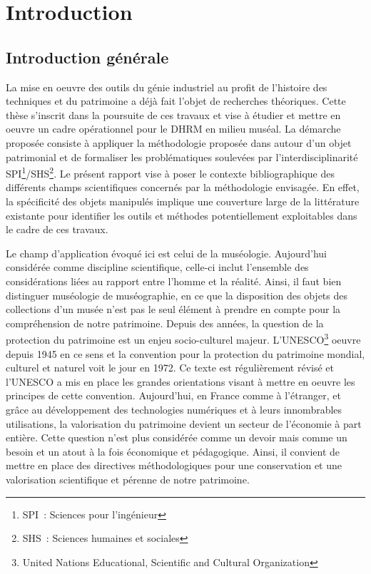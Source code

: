 \documentclass[a4paper,11pt,french]{article}
\begin{document}
\newpage
\tableofcontents
\newpage
\section{Introduction}

\subsection{Introduction générale}
La mise en oeuvre des outils du génie industriel au profit de l'histoire des techniques et du patrimoine a déjà fait l'objet de recherches théoriques\cite{Laroche2007}. Cette thèse s'inscrit dans la poursuite de ces travaux et vise à étudier et mettre en oeuvre un cadre opérationnel pour le DHRM en milieu muséal.
La démarche proposée consiste à appliquer la méthodologie proposée dans \cite{Laroche2007} autour d'un objet patrimonial et de formaliser les problématiques soulevées par l'interdisciplinarité SPI\footnote{SPI~: Sciences pour l'ingénieur}/SHS\footnote{SHS~: Sciences humaines et sociales}.
Le présent rapport vise à poser le contexte bibliographique des différents champs scientifiques concernés par la méthodologie envisagée. En effet, la spécificité des objets manipulés implique une couverture large de la littérature existante pour identifier les outils et méthodes potentiellement exploitables dans le cadre de ces travaux.

Le champ d'application évoqué ici est celui de la muséologie. Aujourd'hui considérée comme discipline scientifique, celle-ci inclut l'ensemble des considérations liées au rapport entre l'homme et la réalité\cite{Desvallees2005}.
Ainsi, il faut bien distinguer muséologie de muséographie, en ce que la disposition des objets des collections d'un musée n'est pas le seul élément à prendre en compte pour la compréhension de notre patrimoine. Depuis des années, la question de la protection du patrimoine est un enjeu socio-culturel majeur. L'UNESCO\footnote{United Nations Educational, Scientific and Cultural Organization} oeuvre depuis
1945 en ce sens et la convention pour la protection du patrimoine mondial, culturel et naturel voit le jour en 1972. Ce texte est régulièrement révisé et l'UNESCO a mis en place les grandes orientations visant à mettre en oeuvre les principes de cette convention\cite{Unesco2008,Cotte2012}.
Aujourd'hui, en France comme à l'étranger, et grâce au développement des technologies numériques et à leurs innombrables utilisations, la valorisation du patrimoine devient un secteur de l'économie à part entière\cite{CAE2011}. Cette question n'est plus considérée comme un devoir mais comme un besoin et un atout à la fois économique et pédagogique.
Ainsi, il convient de mettre en place des directives méthodologiques pour une conservation et une valorisation scientifique et pérenne de notre patrimoine\cite{LAROCHE-2008-422162}.
\end{document}
